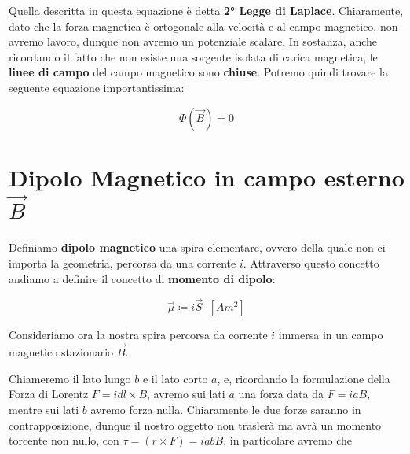 Quella descritta in questa equazione è detta \textbf{2° Legge di Laplace}. Chiaramente, dato che la forza magnetica è ortogonale alla velocità e al campo magnetico, non avremo lavoro, dunque non avremo un potenziale scalare. In sostanza, anche ricordando il fatto che non esiste una sorgente isolata di carica magnetica, le \textbf{linee di campo} del campo magnetico sono \textbf{chiuse}. Potremo quindi trovare la seguente equazione importantissima:

\begin{tcolorbox}[colframe=red, colback=red!10, title=1° Equazione di Maxwell nel Magnetismo Stazionario]
	\begin{large}
		\begin{equation}
			\Phi(\vec{B}) = 0
		\end{equation}
	\end{large}
\end{tcolorbox}

\section{Dipolo Magnetico in campo esterno $\vec{B}$ }
Definiamo \textbf{dipolo magnetico} una spira elementare, ovvero della quale non ci importa la geometria, percorsa da una corrente $i$. Attraverso questo concetto andiamo a definire il concetto di \textbf{momento di dipolo}: 

\begin{large}
	\begin{equation} \label{eq_momento_dipolo_magnetico}
		\vec{\mu} \coloneqq i\vec{S} \;\; \left[Am^2\right]
	\end{equation}
\end{large}

Consideriamo ora la nostra spira percorsa da corrente $i$ immersa in un campo magnetico stazionario $\vec{B}$. 

\begin{figure}[ht]
	\centering
\end{figure}

Chiameremo il lato lungo $b$ e il lato corto $a$, e, ricordando la formulazione della Forza di Lorentz $F = idl \times B$,  avremo sui lati $a$ una forza data da $F = iaB$, mentre sui lati $b$ avremo forza nulla. Chiaramente le due forze saranno in contrapposizione, dunque il nostro oggetto non traslerà ma avrà un momento torcente non nullo, con $\tau = (r \times F) = iabB$, in particolare avremo che 

